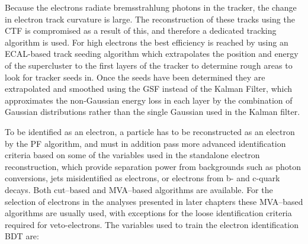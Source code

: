 Because the electrons radiate bremsstrahlung photons in the tracker, the
change in electron track curvature is large. The reconstruction of these
tracks using the \ac{CTF} is compromised as a result of this, and 
therefore a dedicated tracking algorithm is used. For high \pT electrons
the best efficiency is reached by using an \ac{ECAL}-based track seeding
algorithm which extrapolates the position and energy of the supercluster
to the first layers of the tracker to determine rough areas to look for
tracker seeds in. Once the seeds have been determined they are extrapolated
and smoothed using the \ac{GSF} \cite{trk-gsf} instead of the Kalman Filter, which 
approximates the non-Gaussian energy loss in each layer by the combination of 
Gaussian distributions rather than the single Gaussian used in the Kalman filter.


To be identified as an electron, a particle has to be reconstructed as
an electron by the \ac{PF} algorithm, and must in addition pass
more advanced identification criteria based on some of the variables used in the
standalone electron reconstruction, which provide separation power from backgrounds
such as photon conversions, jets misidentified as electrons, or electrons from b- and c-quark
decays. Both cut--based and MVA--based algorithms are available. For the selection of electrons in 
the analyses presented in later chapters these MVA--based algorithms are usually used, 
with exceptions for the loose identification criteria required for veto-electrons. 
The variables used to train the electron identification BDT are:

